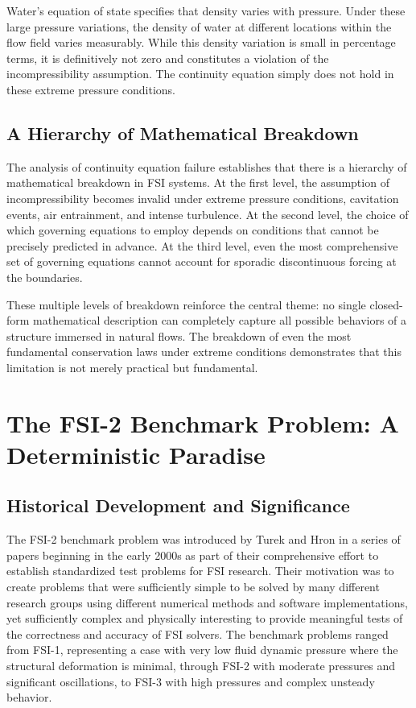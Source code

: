 ﻿\documentclass[a4paper,11pt]{article}
\theoremstyle{definition}
\begin{document}
Water's equation of state specifies that density varies with pressure. Under these large pressure variations, the density of water at different locations within the flow field varies measurably. While this density variation is small in percentage terms, it is definitively not zero and constitutes a violation of the incompressibility assumption. The continuity equation simply does not hold in these extreme pressure conditions.

\subsection{A Hierarchy of Mathematical Breakdown}

The analysis of continuity equation failure establishes that there is a hierarchy of mathematical breakdown in FSI systems. At the first level, the assumption of incompressibility becomes invalid under extreme pressure conditions, cavitation events, air entrainment, and intense turbulence. At the second level, the choice of which governing equations to employ depends on conditions that cannot be precisely predicted in advance. At the third level, even the most comprehensive set of governing equations cannot account for sporadic discontinuous forcing at the boundaries.

These multiple levels of breakdown reinforce the central theme: no single closed-form mathematical description can completely capture all possible behaviors of a structure immersed in natural flows. The breakdown of even the most fundamental conservation laws under extreme conditions demonstrates that this limitation is not merely practical but fundamental.

\section{The FSI-2 Benchmark Problem: A Deterministic Paradise}

\subsection{Historical Development and Significance}

The FSI-2 benchmark problem was introduced by Turek and Hron in a series of papers beginning in the early 2000s as part of their comprehensive effort to establish standardized test problems for FSI research. Their motivation was to create problems that were sufficiently simple to be solved by many different research groups using different numerical methods and software implementations, yet sufficiently complex and physically interesting to provide meaningful tests of the correctness and accuracy of FSI solvers. The benchmark problems ranged from FSI-1, representing a case with very low fluid dynamic pressure where the structural deformation is minimal, through FSI-2 with moderate pressures and significant oscillations, to FSI-3 with high pressures and complex unsteady behavior.
\end{document}
